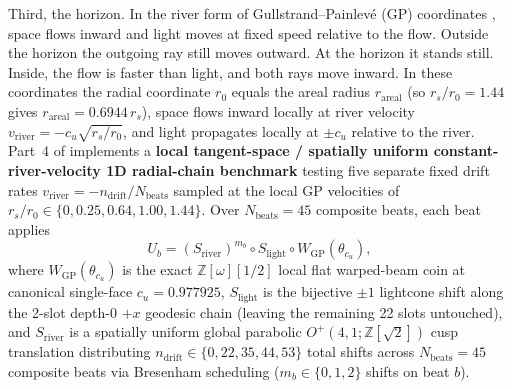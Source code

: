 Third, the horizon. In the river form of Gullstrand--Painlev\'e (GP) coordinates
\cite{unruh1981, hamilton2008river}, space flows inward and light moves at fixed speed relative to the flow. Outside
the horizon the outgoing ray still moves outward. At the horizon it stands still. Inside, the flow is faster than
light, and both rays move inward. In these coordinates the radial coordinate $r_0$ equals the areal radius $r_{\mathrm{areal}}$ (so $r_s / r_0 = 1.44$ gives
$r_{\mathrm{areal}} = 0.6944\, r_s$), space flows inward locally at river velocity $v_{\mathrm{river}} = -c_u \sqrt{r_s / r_0}$,
and light propagates locally at $\pm c_u$ relative to the river. Part~4 of  implements a \textbf{local
tangent-space / spatially uniform constant-river-velocity 1D radial-chain benchmark} testing five separate fixed drift
rates $v_{\mathrm{river}} = -n_{\mathrm{drift}} / N_{\mathrm{beats}}$ sampled at the local GP velocities of
$r_s / r_0 \in \{0, 0.25, 0.64, 1.00, 1.44\}$. Over $N_{\mathrm{beats}} = 45$ composite beats, each beat applies
\begin{equation}
U_b = (S_{\mathrm{river}})^{m_b} \circ S_{\mathrm{light}} \circ W_{\mathrm{GP}}(\theta_{c_u}),
\label{eq:gp-walk}
\end{equation}
where $W_{\mathrm{GP}}(\theta_{c_u})$ is the exact  $\mathbb{Z}[\omega][1/2]$ local flat warped-beam coin
at canonical single-face $c_u = 0.977925$, $S_{\mathrm{light}}$ is the bijective $\pm 1$ lightcone shift along the
2-slot depth-0 $+x$ geodesic chain (leaving the remaining 22 slots untouched), and $S_{\mathrm{river}}$ is a spatially
uniform global parabolic $O^+(4,1; \mathbb{Z}[\sqrt{2}])$ cusp translation distributing
$n_{\mathrm{drift}} \in \{0, 22, 35, 44, 53\}$ total shifts across $N_{\mathrm{beats}} = 45$ composite beats via
Bresenham scheduling ($m_b \in \{0, 1, 2\}$ shifts on beat $b$).

